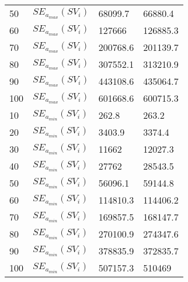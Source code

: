 \begin{table}[H]
\begin{tabular}{ll | ll}
		50                & $SE_{a_{max}}(SV_i)$              & 68099.7                  & 66880.4                          \\
		60                & $SE_{a_{max}}(SV_i)$              & 127666                   & 126885.3                         \\
		70                & $SE_{a_{max}}(SV_i)$              & 200768.6                 & 201139.7                         \\
		80                & $SE_{a_{max}}(SV_i)$              & 307552.1                 & 313210.9                         \\
		90                & $SE_{a_{max}}(SV_i)$              & 443108.6                 & 435064.7                         \\
		100               & $SE_{a_{max}}(SV_i)$              & 601668.6                 & 600715.3                         \\
		10                & $SE_{a_{min}}(SV_i)$            & 262.8                    & 263.2                            \\
		20                & $SE_{a_{min}}(SV_i)$            & 3403.9                   & 3374.4                           \\
		30                & $SE_{a_{min}}(SV_i)$            & 11662                    & 12027.3                          \\
		40                & $SE_{a_{min}}(SV_i)$            & 27762                    & 28543.5                          \\
		50                & $SE_{a_{min}}(SV_i)$            & 56096.1                  & 59144.8                          \\
		60                & $SE_{a_{min}}(SV_i)$            & 114810.3                 & 114406.2                         \\
		70                & $SE_{a_{min}}(SV_i)$            & 169857.5                 & 168147.7                         \\
		80                & $SE_{a_{min}}(SV_i)$            & 270100.9                 & 274347.6                         \\
		90                & $SE_{a_{min}}(SV_i)$            & 378835.9                 & 372835.7                         \\
		100               & $SE_{a_{min}}(SV_i)$            & 507157.3                 & 510469                          
	\end{tabular}
\end{table}